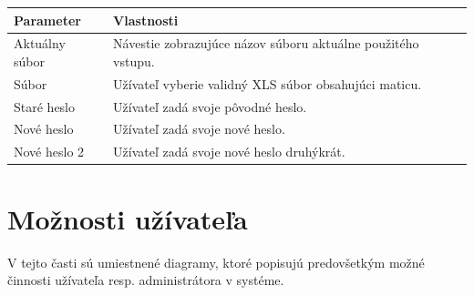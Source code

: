 \documentclass[12pt,a4paper]{report}
\begin{document}
\begin{table}[h!]
	\centering
	\begin{tabular}{|>{\centering\arraybackslash}m{3in}|>{\centering\arraybackslash}m{3in}|}
		\hline
		\centering Parameter & Vlastnosti \\ [0ex]
		\hline
		Aktuálny súbor & Návestie zobrazujúce názov súboru aktuálne použitého vstupu.\\ [0ex]
		\hline
		Súbor & Užívateľ  vyberie  validný XLS súbor obsahujúci maticu. \\ [0ex]
		\hline
		Staré heslo & Užívateľ zadá svoje pôvodné heslo.\\ [0ex]	
		\hline
		Nové heslo & Užívateľ zadá svoje nové heslo. \\ [0ex]		
		\hline
		Nové heslo 2 & Užívateľ zadá svoje nové heslo druhýkrát. \\ [0ex]		
		\hline
	\end{tabular}
\end{table}
\FloatBarrier
\pagebreak
\section[Možnosti užívateľa]{\rmfamily\bfseries
	Možnosti užívateľa}

	V tejto časti sú umiestnené diagramy, ktoré popisujú predovšetkým možné činnosti užívateľa resp. administrátora v systéme.
\end{document}
